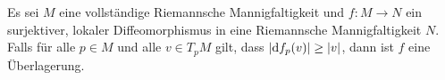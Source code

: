Es sei $M$ eine vollständige Riemannsche Mannigfaltigkeit \pause und $f\colon M\to N$ \pause ein surjektiver, \pause lokaler Diffeomorphismus \pause in eine Riemannsche Mannigfaltigkeit $N$. \pause Falls für alle $p\in M$ und alle $v\in T_pM$ gilt, \pause dass $|\mathrm{d} f_p(v)|\geq |v|$, \pause dann ist $f$ eine Überlagerung. 